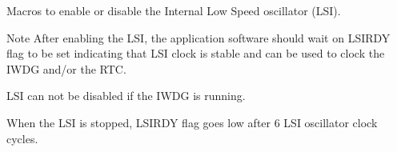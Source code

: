 Macros to enable or disable the Internal Low Speed oscillator (L\+SI). 

\begin{DoxyNote}{Note}
After enabling the L\+SI, the application software should wait on L\+S\+I\+R\+DY flag to be set indicating that L\+SI clock is stable and can be used to clock the I\+W\+DG and/or the R\+TC. 

L\+SI can not be disabled if the I\+W\+DG is running. 

When the L\+SI is stopped, L\+S\+I\+R\+DY flag goes low after 6 L\+SI oscillator clock cycles. 
\end{DoxyNote}
